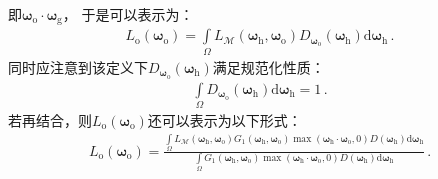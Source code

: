 即${\bm\omega}_{\mathrm{o}}\cdot{\bm\omega}_{\mathrm{g}}$，
于是可以表示为：
\begin{align}\label{eq:08ex01-RadianceMacroOut}
    L_{\mathrm{o}}({\bm\omega}_{\mathrm{o}})
    =\int\limits_{\varOmega}L_{\mathcal{M}}({\bm\omega}_{\mathrm{h}},{\bm\omega}_{\mathrm{o}})
    D_{{\bm\omega}_{\mathrm{o}}}({\bm\omega}_{\mathrm{h}})\mathrm{d}{\bm\omega}_{\mathrm{h}}\, .
\end{align}
同时应注意到该定义下$D_{{\bm\omega}_{\mathrm{o}}}({\bm\omega}_{\mathrm{h}})$满足规范化性质：
\begin{align}
    \int\limits_{\varOmega}D_{{\bm\omega}_{\mathrm{o}}}({\bm\omega}_{\mathrm{h}})
    \mathrm{d}{\bm\omega}_{\mathrm{h}}=1\, .
\end{align}
若再结合，则$L_{\mathrm{o}}({\bm\omega}_{\mathrm{o}})$还可以表示为以下形式：
\begin{align}\label{eq:08ex01-RadianceMacroOutV2}
    L_{\mathrm{o}}({\bm\omega}_{\mathrm{o}})
    =\frac{\displaystyle\int\limits_{\varOmega}L_{\mathcal{M}}({\bm\omega}_{\mathrm{h}},{\bm\omega}_{\mathrm{o}})
    G_1({\bm\omega}_{\mathrm{h}},{\bm\omega}_{\mathrm{o}})
    \max({\bm\omega}_{\mathrm{h}}\cdot{\bm\omega}_{\mathrm{o}},0)
    D({\bm\omega}_{\mathrm{h}})\mathrm{d}{\bm\omega}_{\mathrm{h}}}
    {\displaystyle\int\limits_{\varOmega}G_1({\bm\omega}_{\mathrm{h}},{\bm\omega}_{\mathrm{o}})
    \max({\bm\omega}_{\mathrm{h}}\cdot{\bm\omega}_{\mathrm{o}},0)
    D({\bm\omega}_{\mathrm{h}})\mathrm{d}{\bm\omega}_{\mathrm{h}}}\, .
\end{align}

